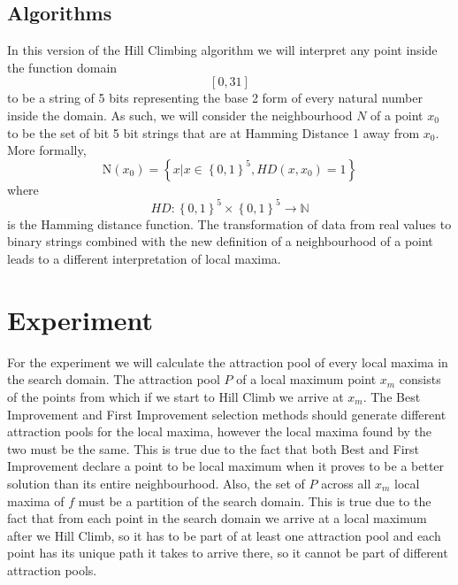 \documentclass {article}
\begin{document}

\subsection{Algorithms}
In this version of the Hill Climbing algorithm we will interpret any point inside the function domain $$\left[0, 31 \right]$$ to be a string of 5 bits representing the base 2 form of every natural number inside the domain. As such, we will consider the neighbourhood $N$ of a point $x_0$  to be the set of bit 5 bit strings that are at Hamming Distance 1 away from $x_0$. More formally, $$ \text{N}\left(x_0\right) = \left\{x | x \in \left\{0, 1\right\}^5, HD(x, x_0) = 1\right\}$$where$$HD:\left\{0, 1\right\}^5 \times \left\{0, 1\right\}^5 \to \mathbb{N}$$ is the Hamming distance function.
The transformation of data from real values to binary strings combined with the new definition of a neighbourhood of a point leads to a different interpretation of local maxima. 


\section {Experiment}
For the experiment we will calculate the attraction pool of every local maxima in the search domain. The attraction pool $P$ of a local maximum point $x_m$ consists of the points from which if we start to Hill Climb we arrive at $x_m$. The Best Improvement and First Improvement selection methods should generate different attraction pools for the local maxima, however the local maxima found by the two must be the same. This is true due to the fact that both Best and First Improvement declare a point to be local maximum when it proves to be a better solution than its entire neighbourhood. Also, the set of $P$ across all $x_m$ local maxima of $f$ must be a partition of the search domain. This is true due to the fact that from each point in the search domain we arrive at a local maximum after we Hill Climb, so it has to be part of at least one attraction pool and each point has its unique path it takes to arrive there, so it cannot be part of different attraction pools.
\end{document}
